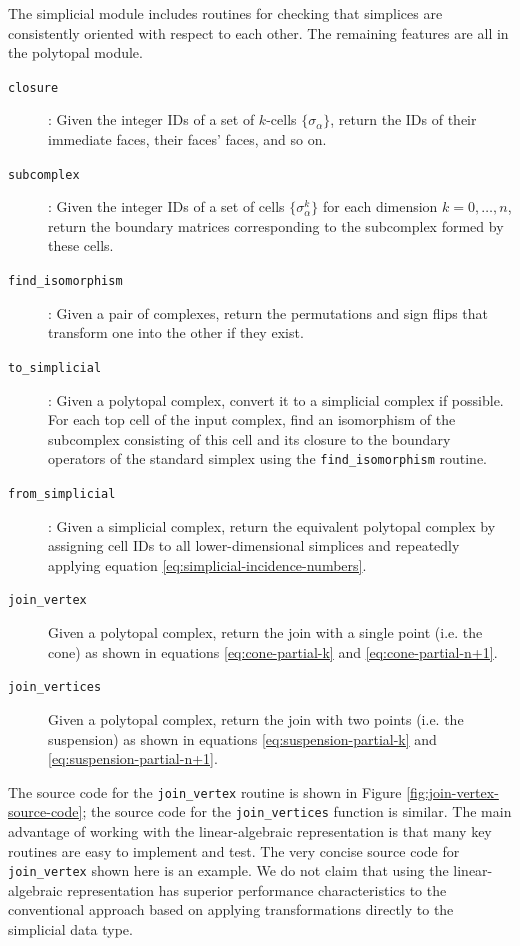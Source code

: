 \documentclass[twocolumn,leqno,twocolumn]{article}
\begin{document}
The simplicial module includes routines for checking that simplices are consistently oriented with respect to each other.
The remaining features are all in the polytopal module.
\begin{description}
    \item[\texttt{closure}]: Given the integer IDs of a set of $k$-cells $\{\sigma_\alpha\}$, return the IDs of their immediate faces, their faces' faces, and so on.
    \item[\texttt{subcomplex}]: Given the integer IDs of a set of cells $\{\sigma_\alpha^k\}$ for each dimension $k = 0,\ldots,n$, return the boundary matrices corresponding to the subcomplex formed by these cells.
    \item[\texttt{find\_isomorphism}]: Given a pair of complexes, return the permutations and sign flips that transform one into the other if they exist.
    \item[\texttt{to\_simplicial}]: Given a polytopal complex, convert it to a simplicial complex if possible.
        For each top cell of the input complex, find an isomorphism of the subcomplex consisting of this cell and its closure to the boundary operators of the standard simplex using the \texttt{find\_isomorphism} routine.
    \item[\texttt{from\_simplicial}]: Given a simplicial complex, return the equivalent polytopal complex by assigning cell IDs to all lower-dimensional simplices and repeatedly applying equation \eqref{eq:simplicial-incidence-numbers}.
    \item[\texttt{join\_vertex}] Given a polytopal complex, return the join with a single point (i.e. the cone) as shown in equations \eqref{eq:cone-partial-k} and \eqref{eq:cone-partial-n+1}.
    \item[\texttt{join\_vertices}] Given a polytopal complex, return the join with two points (i.e. the suspension) as shown in equations \eqref{eq:suspension-partial-k} and \eqref{eq:suspension-partial-n+1}.
\end{description}
The source code for the \texttt{join\_vertex} routine is shown in Figure \ref{fig:join-vertex-source-code}; the source code for the \texttt{join\_vertices} function is similar.
The main advantage of working with the linear-algebraic representation is that many key routines are easy to implement and test.
The very concise source code for \texttt{join\_vertex} shown here is an example.
We do not claim that using the linear-algebraic representation has superior performance characteristics to the conventional approach based on applying transformations directly to the simplicial data type.
\end{document}

